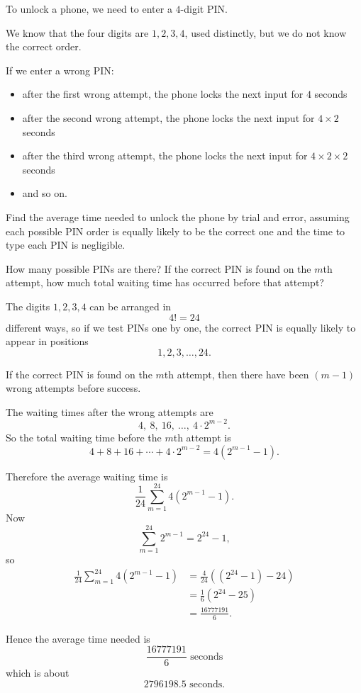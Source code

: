 \begin{problem}
To unlock a phone, we need to enter a $4$-digit PIN.

We know that the four digits are $1,2,3,4$, used distinctly, but we do not know the correct order.

If we enter a wrong PIN:
\begin{itemize}[leftmargin=*]
  \item after the first wrong attempt, the phone locks the next input for $4$ seconds
  \item after the second wrong attempt, the phone locks the next input for $4\times 2$ seconds
  \item after the third wrong attempt, the phone locks the next input for $4\times 2\times 2$ seconds
  \item and so on.
\end{itemize}

Find the average time needed to unlock the phone by trial and error, assuming each possible PIN order is equally likely to be the correct one and the time to type each PIN is negligible.
\end{problem}

\begin{hint}
How many possible PINs are there? If the correct PIN is found on the $m$th attempt, how much total waiting time has occurred before that attempt?
\end{hint}

\begin{solution}
The digits $1,2,3,4$ can be arranged in
\[
4!=24
\]
different ways, so if we test PINs one by one, the correct PIN is equally likely to appear in positions
\[
1,2,3,\dots,24.
\]

If the correct PIN is found on the $m$th attempt, then there have been $(m-1)$ wrong attempts before success.

The waiting times after the wrong attempts are
\[
4,\ 8,\ 16,\ \dots,\ 4\cdot 2^{m-2}.
\]
So the total waiting time before the $m$th attempt is
\[
4+8+16+\cdots+4\cdot 2^{m-2}
=4(2^{m-1}-1).
\]

Therefore the average waiting time is
\[
\frac{1}{24}\sum_{m=1}^{24}4(2^{m-1}-1).
\]
Now
\[
\sum_{m=1}^{24}2^{m-1}=2^{24}-1,
\]
so
\begin{align*}
\frac{1}{24}\sum_{m=1}^{24}4(2^{m-1}-1)
&= \frac{4}{24}\left((2^{24}-1)-24\right) \\
&= \frac{1}{6}(2^{24}-25) \\
&= \frac{16777191}{6}.
\end{align*}

Hence the average time needed is
\[
\boxed{\frac{16777191}{6}\text{ seconds}}
\]
which is about
\[
\boxed{2796198.5\text{ seconds}}.
\]
\end{solution}

